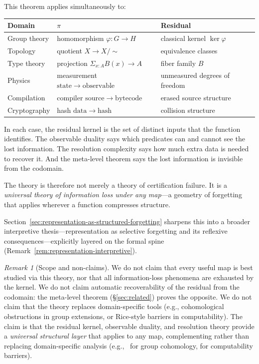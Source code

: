 \documentclass[11pt,a4paper]{article}
\theoremstyle{plain}
\theoremstyle{definition}
\theoremstyle{remark}
\newtheorem{remark}[theorem]{Remark}
\begin{document}
This theorem applies simultaneously to:

\begin{center}
\begin{tabular}{lll}
\toprule
Domain & $\pi$ & Residual \\
\midrule
Group theory & homomorphism $\varphi : G \to H$ & classical kernel $\ker\varphi$ \\
Topology & quotient $X \to X/{\sim}$ & equivalence classes \\
Type theory & projection $\Sigma_{x:A} B(x) \to A$ & fiber family $B$ \\
Physics & measurement $\mathrm{state} \to \mathrm{observable}$ & unmeasured degrees of freedom \\
Compilation & compiler $\mathrm{source} \to \mathrm{bytecode}$ & erased source structure \\
Cryptography & hash $\mathrm{data} \to \mathrm{hash}$ & collision structure \\
\bottomrule
\end{tabular}
\end{center}

\noindent
In each case, the residual kernel is the set of distinct inputs that the
function identifies. The observable duality says which predicates can and
cannot see the lost information. The resolution complexity says how much
extra data is needed to recover it. And the meta-level theorem says the
lost information is invisible from the codomain.

The theory is therefore not merely a theory of certification failure. It is
a \emph{universal theory of information loss under any map}---a geometry of
forgetting that applies wherever a function compresses structure.

Section~\ref{sec:representation-as-structured-forgetting} sharpens this into a broader interpretive thesis---representation as selective forgetting and its reflexive consequences---explicitly layered on the formal spine (Remark~\ref{rem:representation-interpretive}).

\begin{remark}[Scope and non-claims]\label{rem:non-claims}
We do not claim that every useful map is best studied via this theory, nor
that all information-loss phenomena are exhausted by the kernel. We do not
claim automatic recoverability of the residual from the codomain: the
meta-level theorem (\S\ref{sec:related}) proves the opposite. We do not
claim that the theory replaces domain-specific tools (e.g., cohomological
obstructions in group extensions, or Rice-style barriers in computability).
The claim is that the residual kernel, observable duality, and resolution
theory provide a \emph{universal structural layer} that applies to any map,
complementing rather than replacing domain-specific analysis
(e.g.,~\cite{Brown1982} for group cohomology, \cite{Rice1953} for computability barriers).
\end{remark}
\end{document}
